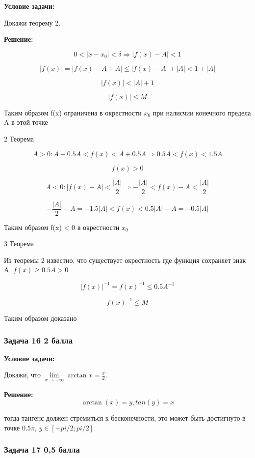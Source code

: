 \documentclass[a4paper,12pt]{article}
\begin{document}
\textbf{Условие задачи:}

Докажи теорему 2.

\textbf{Решение: }

\[
0 < |x - x_0| < \delta \Rightarrow |f(x) - A| < 1
\]

\[
|f(x)|=|f(x)-A+A| \le |f(x) - A| + |A| < 1 + |A|
\]

\[
|f(x)| < |A| + 1
\]

\[
|f(x)| \le M
\]

Таким образом f(x) ограничена в окрестности $x_0$ при налисчии конечного предела A в этой точке

2 Теорема

\[
A > 0: A - 0.5A < f(x) < A+ 0.5A \Rightarrow 0.5A < f(x) < 1.5A
\]

\[
f(x) > 0
\]

\[
A < 0: |f(x) - A| < \frac{|A|}{2} \Rightarrow -\frac{|A|}{2} < f(x) - A < \frac{|A|}{2}
\]

\[
-\frac{|A|}{2} + A = -1.5|A| < f(x) < 0.5|A|+A = -0.5|A|
\]

Таким образом f(x) < 0 в окрестности $x_0$

3 Теорема

Из теоремы 2 известно, что существует окрестность где функция сохраняет знак A. $f(x)\ge 0.5A > 0$

\[
|f(x)|^{-1}=f(x)^{-1}\le 0.5A^{-1}
\]

\[
f(x)^{-1}\le M
\]

Таким образом доказано

\vspace{1cm}

\subsubsection{Задача 16 \hfill 2 балла}

\textbf{Условие задачи:}

Докажи, что $\lim\limits_{x \to +\infty} \arctan x = \frac{\pi}{2}$.

\textbf{Решение: }
\[
\arctan(x)  = y, tan(y) = x
\]

тогда тангенс должен стремиться к бесконечности, это может быть достигнуто в точке $0.5 \pi$, $y \in [-pi/2;pi/2]$

\vspace{1cm}

\subsubsection{Задача 17 \hfill 0,5 балла}
\end{document}
